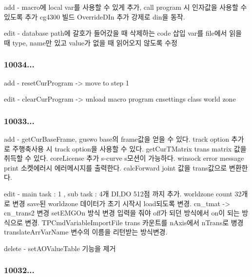 \begin{DoxyVerb}       add - macro에 local var를 사용할 수 있게 추가, call program 시 인자값을 사용할 수 있도록 추가
             cg4300 빌드
             OverrideDIn 추가 강제로 din을 동작.

      edit - database path에 갈호가 들어갔을 때 삭제하는 code 삽입
             var를 file에서 읽을 때 type, name만 있고 value가 없을 때 읽어오지 않도록 수정
\end{DoxyVerb}


\subsubsection*{10034... }

\begin{DoxyVerb}      add - resetCurProgram -> move to step 1

     edit - clearCurProgram -> unload macro program
            cnsettings class
            world zone
\end{DoxyVerb}


\subsubsection*{10033... }

\begin{DoxyVerb}     add  - getCurBaseFrame, guswo base의 frame값을 얻을 수 있다.
            track option 추가로 주행축사용 시 track option을 사용할 수 있다.
            getCurTMatrix trans matrix 값을 취득할 수 있다.
            coreLicense 추가
            s-curve s모션이 가능하다.
            winsock error message print 소켓에러시 에러메시지를 출력한다.
            calcForward joint 값을 trans값으로 변환한다.

     edit - main task : 1 , sub task : 4개
            DI,DO 512점 까지 추가.
            worldzone count 32개로 변경
            save된 worldzone 데이터가 초기 시작시 load되도록 변경.
            cn_tmat -> cn_trans2 변경
            setEMGOn 방식 변경 입력을 줘야 off가 되던 방식에서 on이 되는 방식으로 변경.
            TPCmdVariableImportFile trans 카운트를 nAxis에서 nTrans로 병경
            translateArrVarName 변수의 이름을 리턴받는 방식변경.

   delete - setAOValueTable 기능을 제거
\end{DoxyVerb}


\subsubsection*{10032... }

